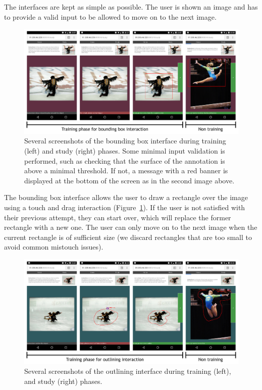 The interfaces are kept as simple as possible.
The user is shown an image and has to provide a valid input
to be allowed to move on to the next image.


\begin{figure}[ht]
\includegraphics[width=\columnwidth]{assets/img/app_rect.jpg}
\caption{Several screenshots of the bounding box interface
during training (left) and study (right) phases.
Some minimal input validation is performed, such as checking
that the surface of the annotation is above a minimal threshold.
If not, a message with a red banner is displayed at the bottom
of the screen as in the second image above.}%
\label{fig:rectangle}
\end{figure}


The bounding box interface allows the user to draw a rectangle
over the image using a touch and drag interaction (Figure~\ref{fig:rectangle}).
If the user is not satisfied with their previous attempt,
they can start over, which will replace the former rectangle with a new one.
The user can only move on to the next image when the current rectangle
is of sufficient size (we discard rectangles
that are too small to avoid common mistouch issues).


\begin{figure}[ht]
\includegraphics[width=\columnwidth]{assets/img/app_outline.jpg}
\caption{Several screenshots of the outlining interface
during training (left), and study (right) phases.}%
\label{fig:outline}
\end{figure}


